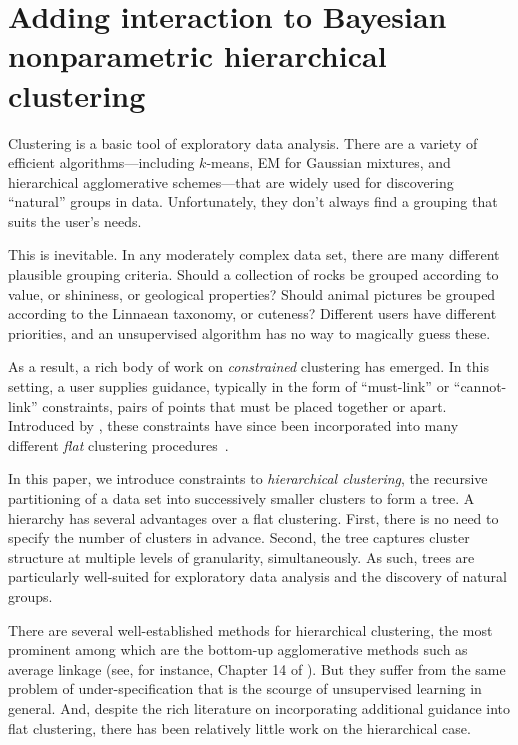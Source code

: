 \chapter{Adding interaction to Bayesian nonparametric hierarchical clustering}
\label{chap:ibhc}

Clustering is a basic tool of exploratory data analysis. There are a variety of efficient algorithms---including $k$-means, EM for Gaussian mixtures, and hierarchical agglomerative schemes---that are widely used for discovering ``natural'' groups in data. Unfortunately, they don't always find a grouping that suits the user's needs.

This is inevitable. In any moderately complex data set, there are many different plausible grouping criteria. Should a collection of rocks be grouped according to value, or shininess, or geological properties? Should animal pictures be grouped according to the Linnaean taxonomy, or cuteness? Different users have different priorities, and an unsupervised algorithm has no way to magically guess these.

As a result, a rich body of work on {\it constrained} clustering has emerged.
In this setting, a user supplies guidance, typically in the form of ``must-link'' or ``cannot-link'' constraints, pairs of points that must be placed together or apart. Introduced by \citet{WC00}, these constraints have since been incorporated into many different {\it flat} clustering procedures~\cite{WCRS01,BBC04,BBM04,KBDM05,BJ14}.

In this paper, we introduce constraints to {\it hierarchical clustering}, the recursive partitioning of a data set into successively smaller clusters to form a tree. A hierarchy has several advantages over a flat clustering. First, there is no need to specify the number of clusters in advance. Second, the tree captures cluster structure at multiple levels of granularity, simultaneously. As such, trees are particularly well-suited for exploratory data analysis and the discovery of natural groups.

There are several well-established methods for hierarchical clustering, the most prominent among which are the bottom-up agglomerative methods such as average linkage (see, for instance, Chapter 14 of \cite{HTF09}). But they suffer from the same problem of under-specification that is the scourge of unsupervised learning in general. And, despite the rich literature on incorporating additional guidance into flat clustering, there has been relatively little work on the hierarchical case.

